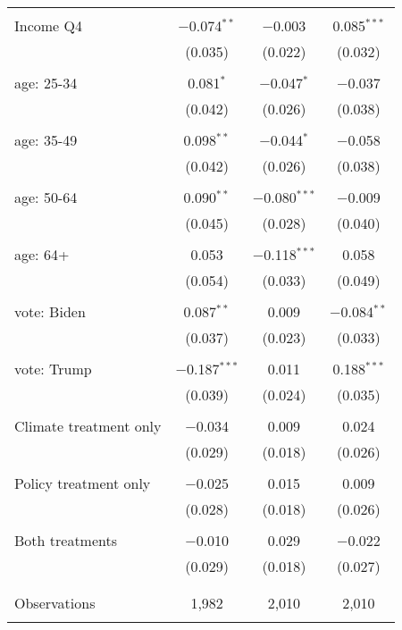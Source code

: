 \begin{tabular}{@{\extracolsep{5pt}}lccc}
  & & & \\ 
 Income Q4 & $-$0.074$^{**}$ & $-$0.003 & 0.085$^{***}$ \\ 
  & (0.035) & (0.022) & (0.032) \\ 
  & & & \\ 
 age: 25-34 & 0.081$^{*}$ & $-$0.047$^{*}$ & $-$0.037 \\ 
  & (0.042) & (0.026) & (0.038) \\ 
  & & & \\ 
 age: 35-49 & 0.098$^{**}$ & $-$0.044$^{*}$ & $-$0.058 \\ 
  & (0.042) & (0.026) & (0.038) \\ 
  & & & \\ 
 age: 50-64 & 0.090$^{**}$ & $-$0.080$^{***}$ & $-$0.009 \\ 
  & (0.045) & (0.028) & (0.040) \\ 
  & & & \\ 
 age: 64+ & 0.053 & $-$0.118$^{***}$ & 0.058 \\ 
  & (0.054) & (0.033) & (0.049) \\ 
  & & & \\ 
 vote: Biden & 0.087$^{**}$ & 0.009 & $-$0.084$^{**}$ \\ 
  & (0.037) & (0.023) & (0.033) \\ 
  & & & \\ 
 vote: Trump & $-$0.187$^{***}$ & 0.011 & 0.188$^{***}$ \\ 
  & (0.039) & (0.024) & (0.035) \\ 
  & & & \\ 
 Climate treatment only & $-$0.034 & 0.009 & 0.024 \\ 
  & (0.029) & (0.018) & (0.026) \\ 
  & & & \\ 
 Policy treatment only & $-$0.025 & 0.015 & 0.009 \\ 
  & (0.028) & (0.018) & (0.026) \\ 
  & & & \\ 
 Both treatments & $-$0.010 & 0.029 & $-$0.022 \\ 
  & (0.029) & (0.018) & (0.027) \\ 
  & & & \\ 
\hline \\[-1.8ex] 

Observations & 1,982 & 2,010 & 2,010 \\ 
\hline 
\hline \\[-1.8ex] 
\end{tabular} 